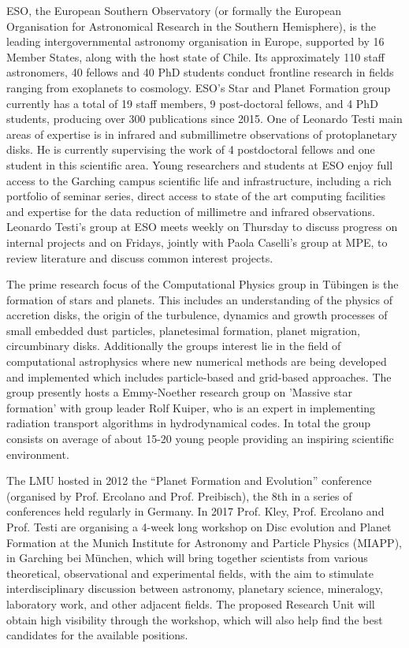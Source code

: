\documentclass[10pt,fleqn,twoside]{article}
\begin{document}
 ESO, the European Southern Observatory (or formally the European Organisation for Astronomical Research in the Southern Hemisphere), is the leading intergovernmental astronomy organisation in Europe, supported by 16 Member States, along with the host state of Chile. Its approximately 110 staff astronomers, 40 fellows and 40 PhD students conduct frontline research in fields ranging from exoplanets to cosmology. ESO’s Star and Planet Formation group currently has a total of 19 staff members, 9 post-doctoral fellows, and 4 PhD students, producing over 300 publications since 2015. One of Leonardo Testi main areas of expertise is in infrared and submillimetre observations of protoplanetary disks. He is currently supervising the work of 4 postdoctoral fellows and one student in this scientific area. Young researchers and students at ESO enjoy full access to the Garching campus scientific life and infrastructure, including a rich portfolio of seminar series, direct access to state of the art computing facilities and expertise for the data reduction of millimetre and infrared observations. Leonardo Testi’s group at ESO meets weekly on Thursday to discuss progress on internal projects and on Fridays, jointly with Paola Caselli’s group at MPE, to review literature and discuss common interest projects.


% 
The prime research focus of the Computational Physics group in T\"ubingen is the
formation of stars and planets. This includes an understanding
of the physics of accretion disks, the origin of the turbulence, dynamics
and growth processes of small embedded dust particles, planetesimal formation,
planet migration, circumbinary disks. Additionally the groups interest lie in the
field of computational astrophysics where new numerical methods are being developed and
implemented which includes particle-based and grid-based approaches.
The group presently hosts a Emmy-Noether research group on 'Massive star formation'
with group leader Rolf Kuiper, who is an expert in implementing
radiation transport algorithms in hydrodynamical codes. In total the
group consists on average of about 15-20 young people providing an
inspiring scientific environment. 

The LMU hosted in 2012 the ``Planet Formation and Evolution''
conference (organised by Prof. Ercolano and Prof. Preibisch), the 8th
in a series of conferences held regularly in Germany. In 2017
Prof. Kley, Prof. Ercolano and Prof. Testi are organising a 4-week
long workshop on Disc evolution and Planet Formation at the Munich
Institute for Astronomy and Particle Physics (MIAPP), in Garching bei
M\"unchen, which will bring
together scientists from various theoretical, observational and
experimental fields, with the aim to stimulate interdisciplinary
discussion between astronomy, planetary science, mineralogy,
laboratory work, and other adjacent fields. The proposed Research Unit
will obtain high visibility through the workshop, which will also help
find the best candidates for the available positions. 
\end{document}
